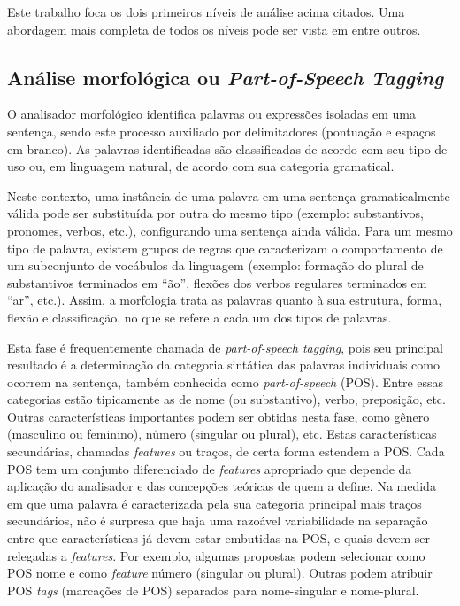 Este trabalho foca os dois primeiros níveis de análise acima citados. Uma abordagem mais completa de todos os níveis pode ser vista em \cite{allen95,vera01} entre outros.


\subsection{Análise morfológica ou \emph{Part-of-Speech Tagging}} %
\label{sub:analise_morfologica_ou_part_of_speech_tagging}

O analisador morfológico identifica palavras ou expressões isoladas em uma sentença, sendo este processo auxiliado por delimitadores (pontuação e espaços em branco). As palavras identificadas são classificadas de acordo com seu tipo de uso ou, em linguagem natural, de acordo com sua categoria gramatical.

Neste contexto, uma instância de uma palavra em uma sentença gramaticalmente válida pode ser substituída por outra do mesmo tipo (exemplo: substantivos, pronomes, verbos, etc.), configurando uma sentença ainda válida. Para um mesmo tipo de palavra, existem grupos de regras que caracterizam o comportamento de um subconjunto de vocábulos da linguagem (exemplo: formação do plural de substantivos terminados em ``ão'', flexões dos verbos regulares terminados em ``ar'', etc.). Assim, a morfologia trata as palavras quanto à sua estrutura, forma, flexão e classificação, no que se refere a cada um dos tipos de palavras.

Esta fase é frequentemente chamada de \emph{part-of-speech tagging}, pois seu principal resultado é a determinação da categoria sintática das palavras individuais como ocorrem na sentença, também conhecida como \emph{part-of-speech} (POS). Entre essas categorias estão tipicamente as de nome (ou substantivo), verbo, preposição, etc. Outras características importantes podem ser obtidas nesta fase, como gênero (masculino ou feminino), número (singular ou plural), etc. Estas características secundárias, chamadas \emph{features} ou traços, de certa forma estendem a POS. Cada POS tem um conjunto diferenciado de \emph{features} apropriado que depende da aplicação do analisador e das concepções teóricas de quem a define. Na medida em que uma palavra é caracterizada pela sua categoria principal mais traços secundários, não é surpresa que haja uma razoável variabilidade na separação entre que características já devem estar embutidas na POS, e quais devem ser relegadas a \emph{features}. Por exemplo, algumas propostas podem selecionar como POS nome e como \emph{feature} número (singular ou plural). Outras podem atribuir POS \emph{tags} (marcações de POS) separados para nome-singular e nome-plural.

